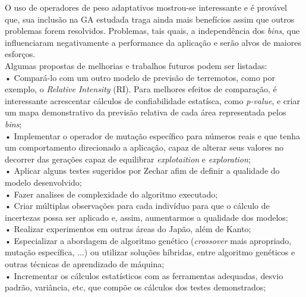 O uso de operadores de peso adaptativos mostrou-se interessante e é provável que, sua inclusão na GA estudada traga ainda mais benefícios assim que outros problemas forem resolvidos. Problemas, tais quais, a independência dos {\it bins}, que influenciaram negativamente a performance da aplicação e serão alvos de maiores esforços.\\



Algumas propostas de melhorias e trabalhos futuros podem ser listadas:\\

• Compará-lo com um outro modelo de previsão de terremotos, como por exemplo, o {\it Relative Intensity} (RI). Para melhores efeitos de comparação, é interessante acrescentar cálculos de confiabilidade estatísca, como {\it p-value}, e criar um mapa demonstrativo da previsão relativa de cada área representada pelos {\it bins};\\%

• Implementar o operador de mutação específico para números reais e que tenha um comportamento direcionado a aplicação, capaz de alterar seus valores no decorrer das gerações capaz de equilibrar {\it explotaition} e {\it exploration};\\

• Aplicar alguns testes sugeridos por Zechar\citep{zechartheme} afim de definir a qualidade do modelo desenvolvido;\\

• Fazer analises de complexidade do algoritmo executado;\\

• Criar múltiplas observações para cada indivíduo para que o cálculo de incertezas possa ser aplicado e, assim, aumentarmos a qualidade dos modelos;\\

• Realizar experimentos em outras áreas do Japão, além de Kanto;\\

• Especializar a abordagem de algoritmo genético ({\it crossover} mais apropriado, mutação específica, ...) ou  utilizar soluções híbridas, entre algoritmo genéticos e outras técnicas de aprendizado de máquina;\\

• Incrementar os cálculos estatísticos com as ferramentas adequadas, desvio padrão, variância, etc, que compõe os cálculos dos testes demonstrados;\\

